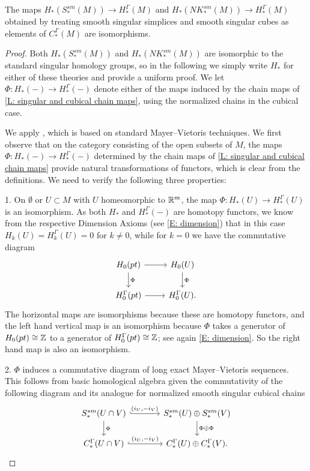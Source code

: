 \begin{theorem}\label{T: hom iso map}
	The maps $H_*(S^{sm}_*(M)) \to H_*^\Gamma(M)$ and $H_*(NK^{sm}_*(M)) \to H_*^\Gamma(M)$ obtained by treating smooth singular simplices and smooth singular cubes as elements of $C_*^\Gamma(M)$ are isomorphisms.
\end{theorem}

\begin{proof}
	Both $H_*(S^{sm}_*(M))$ and $H_*(NK^{sm}_*(M))$ are isomorphic to the standard singular homology groups, so in the following we simply write $H_*$ for either of these theories and provide a uniform proof.
	We let $\Phi: H_*(-) \to H_*^\Gamma(-)$ denote either of the maps induced by the chain maps of \cref{L: singular and cubical chain maps}, using the normalized chains in the cubical case.

	We apply \cite[Theorem 5.1.1]{Frie20}, which is based on standard Mayer--Vietoris techniques.
	We first observe that on the category consisting of the open subsets of $M$, the maps $\Phi: H_*(-) \to H_*^\Gamma(-)$ determined by the chain maps of \cref{L: singular and cubical chain maps} provide natural transformations of functors, which is clear from the definitions.
	We need to verify the following three properties:

	1.
	On $\emptyset$ or $U \subset M$ with $U$ homeomorphic to $\mathbb{R}^m$, the map $\Phi: H_*(U) \to H_*^\Gamma(U)$ is an isomorphism.
	As both $H_*$ and $H_*^\Gamma(-)$ are homotopy functors, we know from the respective Dimension Axioms (see \cref{E: dimension}) that in this case $H_k(U) = H_k^\Gamma(U) = 0$ for $k\neq 0$, while for $k = 0$ we have the commutative diagram
	\[
	\begin{tikzcd}
		H_0(pt) \arrow[r] \arrow[d, "\Phi"] & H_0(U) \arrow[d, "\Phi"] \\
		H_0^\Gamma(pt) \arrow[r] & H^\Gamma_0(U).
	\end{tikzcd}
	\]
	The horizontal maps are isomorphisms because these are homotopy functors, and the left hand vertical map is an isomorphism because $\Phi$ takes a generator of $H_0(pt) \cong \mathbb{Z}$ to a generator of $H_0^\Gamma(pt) \cong \mathbb{Z}$; see again \cref{E: dimension}.
	So the right hand map is also an isomorphism.

	2.
	$\Phi$ induces a commutative diagram of long exact Mayer--Vietoris sequences.
	This follows from basic homological algebra given the commutativity of the following diagram and its analogue for normalized smooth singular cubical chains
	\[
	\begin{tikzcd}[column sep=large]
		S^{sm}_*(U \cap V) \arrow[r, "{(i_U, -i_V)}", hook] \arrow[d, "\Phi"] & S^{sm}_*(U) \oplus S^{sm}_*(V) \arrow[d, "\Phi \oplus \Phi"] \\
		C_*^\Gamma(U \cap V) \arrow[r, "{(i_U, -i_V)}", hook] & C_*^\Gamma(U) \oplus C_*^\Gamma(V).
	\end{tikzcd}
	\]


\end{proof}
